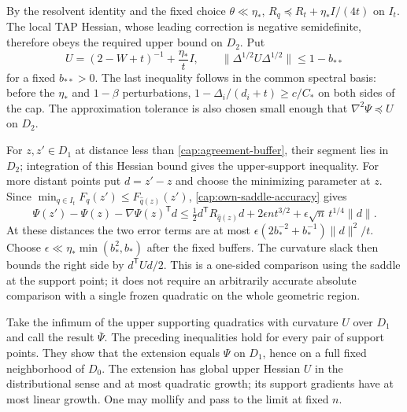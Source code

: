 By the resolvent identity and the fixed choice $\theta\ll\eta_*$,
$R_q\preceq R_t+\eta_*I/(4t)$ on $I_t$. The local TAP Hessian, whose leading
correction is negative semidefinite, therefore obeys the required upper
bound on $D_2$. Put
\begin{equation}\label{cap:initial-support-curvature}
 U=(2-W+t)^{-1}+\frac{\eta_*}{t}I,
 \qquad \|\Delta^{1/2}U\Delta^{1/2}\|\le1-b_{**}
\end{equation}
for a fixed $b_{**}>0$. The last inequality follows in the common spectral
basis: before the $\eta_*$ and $1-\beta$ perturbations,
$1-\Delta_i/(d_i+t)\ge c/C_*$ on both sides of the cap. The approximation
tolerance is also chosen small enough that $\nabla^2\Psi\preceq U$ on $D_2$.

For $z,z'\in D_1$ at distance less than
\eqref{cap:agreement-buffer}, their segment lies in $D_2$; integration of
this Hessian bound gives the upper-support inequality. For more distant
points put $d=z'-z$ and choose the minimizing parameter at $z$.
Since $\min_{q\in I_t}F_q(z')\le F_{\widehat q(z)}(z')$,
\eqref{cap:own-saddle-accuracy} gives
\[
 \Psi(z')-\Psi(z)-\nabla\Psi(z)^{\mathsf T}d
 \le\tfrac12d^{\mathsf T}R_{\widehat q(z)}d
       +2\epsilon nt^{3/2}
       +\epsilon\sqrt n\,t^{1/4}\|d\|.
\]
At these distances the two error terms are at most
$\epsilon(2b_*^{-2}+b_*^{-1})\|d\|^2/t$. Choose
$\epsilon\ll\eta_*\min(b_*^2,b_*)$ after the fixed buffers. The curvature
slack then bounds the right side by $d^{\mathsf T}Ud/2$. This is a
one-sided comparison using the saddle at the support point; it does not
require an arbitrarily accurate absolute comparison with a single frozen
quadratic on the whole geometric region.

Take the infimum of the upper supporting quadratics with curvature $U$
over $D_1$ and call the result $\overline\Psi$. The preceding inequalities
hold for every pair of support points. They show that the extension equals
$\Psi$ on $D_1$, hence on a full fixed neighborhood of $D_0$. The extension
has global upper Hessian $U$ in the distributional sense and at most
quadratic growth; its support gradients have at most linear growth. One may
mollify and pass to the limit at fixed $n$.

